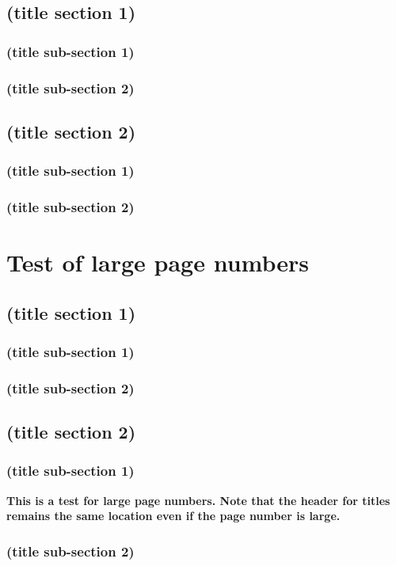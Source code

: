 \section{(title section 1)}
\subsection{(title sub-section 1)}
\subsection{(title sub-section 2)}
\section{(title section 2)}
\subsection{(title sub-section 1)}
\subsection{(title sub-section 2)}
\chapter{Test of large page numbers}
\section{(title section 1)}
\subsection{(title sub-section 1)}
\subsection{(title sub-section 2)}
\section{(title section 2)}
\setcounter{page}{1000}
\subsection{(title sub-section 1)}
\textbf{This is a test for large page numbers. Note that the header for titles remains the same location even if the page number is large.}

\lipsum[13-20]
\subsection{(title sub-section 2)}
\lipsum[13-20]

